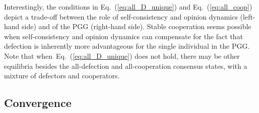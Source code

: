 \documentclass[letterpaper, 10 pt, conference]{ieeeconf}  %
\newcommand{\vect}[1]{\boldsymbol{#1}}
\newtheorem{remark}{Remark}
\renewcommand{\eqref}[1]{Eq.~(\ref{#1})}  %
\begin{document}
Interestingly, the conditions in \eqref{eq:all_D_unique} and \eqref{eq:all_coop} depict a trade-off between the role of self-consistency and opinion dynamics (left-hand side) and of the PGG (right-hand side). Stable cooperation seems possible when self-consistency and opinion dynamics can compensate for the fact that defection is inherently more advantageous for the single individual in the PGG. Note that when~\eqref{eq:all_D_unique} does not hold, there may be other equilibria besides the all-defection and all-cooperation consensus states, with a mixture of defectors and cooperators.




% 

\subsection{Convergence}
\end{document}
